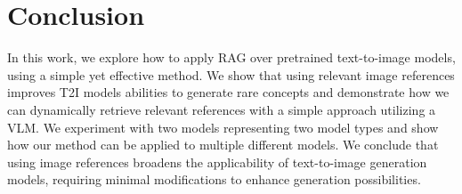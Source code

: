 \section{Conclusion} 
\label{sec:conclusion}

In this work, we explore how to apply RAG over pretrained text-to-image models, using a simple yet effective method. We show that using relevant image references improves T2I models abilities to generate rare concepts and demonstrate how we can dynamically retrieve relevant references with a simple approach utilizing a VLM. We experiment with two models representing two model types and show how our method can be applied to multiple different models.
We conclude that using image references broadens the applicability of text-to-image generation models, requiring minimal modifications to enhance generation possibilities.